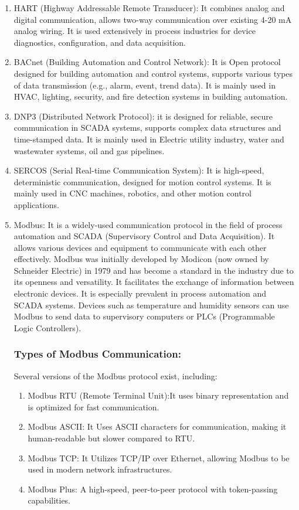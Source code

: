 \begin{enumerate}
    \item HART (Highway Addressable Remote Transducer): It combines analog and digital communication, allows two-way communication over existing 4-20 mA analog wiring. It is used extensively in process industries for device diagnostics, configuration, and data acquisition.
    \item BACnet (Building Automation and Control Network): It is Open protocol designed for building automation and control systems, supports various types of data transmission (e.g., alarm, event, trend data). It is mainly used in HVAC, lighting, security, and fire detection systems in building automation.
    \item DNP3 (Distributed Network Protocol): it is designed for reliable, secure communication in SCADA systems, supports complex data structures and time-stamped data. It is mainly used in Electric utility industry, water and wastewater systems, oil and gas pipelines.
    \item SERCOS (Serial Real-time Communication System): It is high-speed, deterministic communication, designed for motion control systems. It is mainly used in  CNC machines, robotics, and other motion control applications.
    \item Modbus: It is a widely-used communication protocol in the field of process automation and SCADA (Supervisory Control and Data Acquisition). It allows various devices and equipment to communicate with each other effectively. Modbus was initially developed by Modicon (now owned by Schneider Electric) in 1979 and has become a standard in the industry due to its openness and versatility. It facilitates the exchange of information between electronic devices. It is especially prevalent in process automation and SCADA systems. Devices such as temperature and humidity sensors can use Modbus to send data to supervisory computers or PLCs (Programmable Logic Controllers).

\subsubsection{Types of Modbus Communication:} Several versions of the Modbus protocol exist, including:
\begin{enumerate}
    \item Modbus RTU (Remote Terminal Unit):It uses binary representation and is optimized for fast communication.
    \item Modbus ASCII: It Uses ASCII characters for communication, making it human-readable but slower compared to RTU.
    \item Modbus TCP: It Utilizes TCP/IP over Ethernet, allowing Modbus to be used in modern network infrastructures.
    \item Modbus Plus: A high-speed, peer-to-peer protocol with token-passing capabilities.
\end{enumerate}


\end{enumerate}

